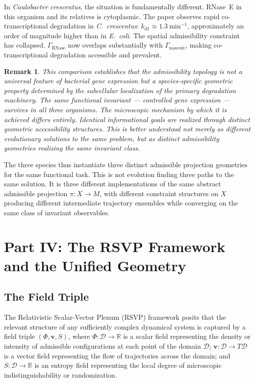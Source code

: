 \documentclass[12pt, a4paper]{article}
\theoremstyle{essaystyle}
\newtheorem*{remark}{Remark}
\begin{document}
In \textit{Caulobacter crescentus}, the situation is fundamentally different. RNase~E
in this organism and its relatives is cytoplasmic. The paper observes rapid
co-transcriptional degradation in \textit{C.~crescentus}: $k_{d1} \approx 1.3 \
\mathrm{min}^{-1}$, approximately an order of magnitude higher than in
\textit{E.~coli}. The spatial admissibility constraint has collapsed.
$\Gamma_{\mathrm{RNase}}$ now overlaps substantially with $\Gamma_{\mathrm{nascent}}$,
making co-transcriptional degradation accessible and prevalent.

\begin{remark}
This comparison establishes that the admissibility topology is not a universal feature
of bacterial gene expression but a species-specific geometric property determined by the
subcellular localization of the primary degradation machinery. The same functional
invariant --- controlled gene expression --- survives in all three organisms. The
microscopic mechanism by which it is achieved differs entirely. Identical informational
goals are realized through distinct geometric accessibility structures. This is better
understood not merely as different evolutionary solutions to the same problem, but as
distinct admissibility geometries realizing the same invariant class.
\end{remark}

The three species thus instantiate three distinct admissible projection geometries for
the same functional task. This is not evolution finding three paths to the same
solution. It is three different implementations of the same abstract admissible
projection $\pi : X \to M$, with different constraint structures on $X$ producing
different intermediate trajectory ensembles while converging on the same class of
invariant observables.

\section{Part IV: The RSVP Framework and the Unified Geometry}

\subsection{The Field Triple}

The Relativistic Scalar-Vector Plenum (RSVP) framework posits that the relevant
structure of any sufficiently complex dynamical system is captured by a field triple
$(\Phi, \mathbf{v}, S)$, where $\Phi : \mathcal{D} \to \mathbb{R}$ is a scalar field
representing the density or intensity of admissible configurations at each point of the
domain $\mathcal{D}$; $\mathbf{v} : \mathcal{D} \to T\mathcal{D}$ is a vector field
representing the flow of trajectories across the domain; and $S : \mathcal{D} \to
\mathbb{R}$ is an entropy field representing the local degree of microscopic
indistinguishability or randomization.
\end{document}
